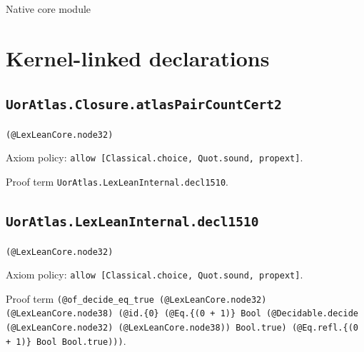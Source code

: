 \documentclass[11pt]{article}
\begin{document}
\begin{center}{\LARGE Native core module}\end{center}
\section*{Kernel-linked declarations}
\subsection*{\texttt{UorAtlas.Closure.atlasPairCountCert2}}
\noindent\texttt{(@LexLeanCore.node32)}\par
\noindent Axiom policy: \texttt{allow [Classical.choice, Quot.sound, propext]}.\par
\noindent Proof term \texttt{UorAtlas.LexLeanInternal.decl1510}.\par
\subsection*{\texttt{UorAtlas.LexLeanInternal.decl1510}}
\noindent\texttt{(@LexLeanCore.node32)}\par
\noindent Axiom policy: \texttt{allow [Classical.choice, Quot.sound, propext]}.\par
\noindent Proof term \texttt{(@of\_decide\_eq\_true (@LexLeanCore.node32) (@LexLeanCore.node38) (@id.\{0\} (@Eq.\{(0 + 1)\} Bool (@Decidable.decide (@LexLeanCore.node32) (@LexLeanCore.node38)) Bool.true) (@Eq.refl.\{(0 + 1)\} Bool Bool.true)))}.\par
\end{document}
